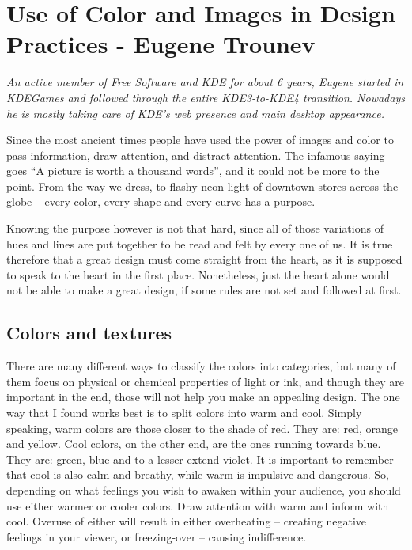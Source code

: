 \chapter{Use of Color and Images in Design Practices - Eugene Trounev}

\textit{An active member of Free Software and KDE for about 6 years, Eugene started in KDEGames and followed through the entire KDE3-to-KDE4 transition. Nowadays he is mostly taking care of KDE's web presence and main desktop appearance.}

Since the most ancient times people have used the power of images and color to
pass information, draw attention, and distract attention. The infamous
saying goes ``A picture is worth a thousand words'', and it could not be more to
the point. From the way we dress, to flashy neon light of downtown stores across
the globe -- every color, every shape and every curve has a purpose.

Knowing the purpose however is not that hard, since all of those variations of
hues and lines are put together to be read and felt by every one of us. It is
true therefore that a great design must come straight from the heart, as it is
supposed to speak to the heart in the first place. Nonetheless, just the heart
alone would not be able to make a great design, if some rules are not set and
followed at first.

\section*{Colors and textures}

There are many different ways to classify the colors into categories, but many of
them focus on physical or chemical properties of light or ink, and though they are
important in the end, those will not help you make an appealing design. The one way
that I found works best is to split colors into warm and cool. Simply speaking,
warm colors are those closer to the shade of red. They are: red, orange and
yellow. Cool colors, on the other end, are the ones running towards blue. They are: green,
blue and to a lesser extend violet. It is important to remember that cool is
also calm and breathy, while warm is impulsive and dangerous. So, depending on
what feelings you wish to awaken within your audience, you should use either
warmer or cooler colors. Draw attention with warm and inform with cool.
Overuse of either will result in either overheating -- creating negative feelings
in your viewer, or freezing-over -- causing indifference.

